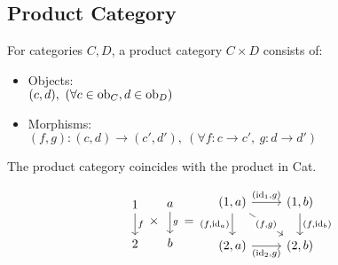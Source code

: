 \subsection{Product Category}
\begin{definition}
  For categories $C,D$, a product category $C\times D$ consists of:
  \parencite{awodey:category_theory}
  \begin{itemize}
    \item Objects:\\
      $(c, d),\ (\forall c \in \mathrm{ob}_C, d \in \mathrm{ob}_D)$
    \item Morphisms:\\
      $(f,g) : (c,d) \to (c', d'),\ (\forall f: c \to
        c',\ g:d \to d')$
  \end{itemize}
\end{definition}

\begin{remark}
  The product category coincides with the product in Cat.
\end{remark}

\begin{example}
  \[
    \begin{tikzcd}
      1 \\
      2
      \arrow["f", from=1-1, to=2-1]
    \end{tikzcd}
    \times
    \begin{tikzcd}
      a \\
      b
      \arrow["g", from=1-1, to=2-1]
    \end{tikzcd}
    =
    \begin{tikzcd}
      {(1,a)} & {(1,b)} \\
      {(2,a)} & {(2,b)}
      \arrow["{(\id_1,g)}", from=1-1, to=1-2]
      \arrow["{(f,\id_a)}"', from=1-1, to=2-1]
      \arrow["{(\id_2,g)}"', from=2-1, to=2-2]
      \arrow["{(f,\id_b)}", from=1-2, to=2-2]
      \arrow["{(f,g)}"{description}, from=1-1, to=2-2]
    \end{tikzcd}
  \]
\end{example}
